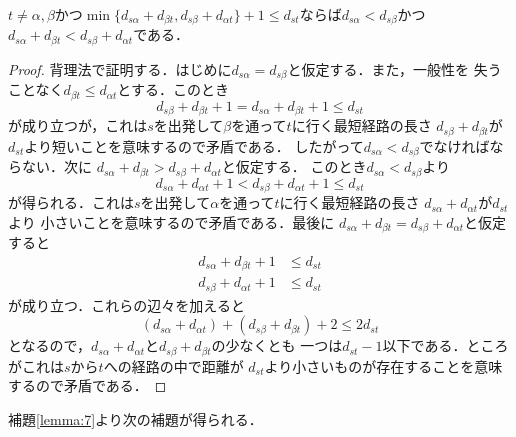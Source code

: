 \begin{lemma}
$t \neq \alpha, \beta$かつ$\min\{d_{s\alpha}+d_{\beta t}, d_{s\beta}+d_{\alpha t}\}+1
\leq d_{st}$ならば$d_{s\alpha}<d_{s\beta}$かつ$d_{s\alpha}+d_{\beta t} < d_{s\beta}+d_{\alpha t}$である．
\label{lemma:7}
\end{lemma}
\begin{proof}
背理法で証明する．はじめに$d_{s\alpha}=d_{s\beta}$と仮定する．また，一般性を
失うことなく$d_{\beta t} \leq d_{\alpha t}$とする．このとき
\[
 d_{s\beta}+d_{\beta t}+1=d_{s\alpha}+d_{\beta t}+1 \leq d_{st}
\]
が成り立つが，これは$s$を出発して$\beta$を通って$t$に行く最短経路の長さ
$d_{s\beta}+d_{\beta t}$が$d_{st}$より短いことを意味するので矛盾である．
したがって$d_{s\alpha}<d_{s\beta}$でなければならない．次に
$d_{s\alpha}+d_{\beta t} > d_{s\beta}+d_{\alpha t}$と仮定する．
このとき$d_{s\alpha}<d_{s\beta}$より
\[
 d_{s\alpha}+d_{\alpha t}+1 < d_{s\beta}+d_{\alpha t}+1 \leq d_{st}
\]
が得られる．これは$s$を出発して$\alpha$を通って$t$に行く最短経路の長さ
$d_{s\alpha}+d_{\alpha t}$が$d_{st}$より
小さいことを意味するので矛盾である．最後に
$d_{s\alpha}+d_{\beta t} = d_{s\beta}+d_{\alpha t}$と仮定すると
\begin{align}
d_{s\alpha}+d_{\beta t}+1 &\leq d_{st} \\
d_{s\beta }+d_{\alpha t}+1 &\leq d_{st}
\end{align}
が成り立つ．これらの辺々を加えると
\[
 (d_{s\alpha}+d_{\alpha t})+(d_{s\beta}+d_{\beta t})+2 \leq 2d_{st}
\]
となるので，$d_{s\alpha}+d_{\alpha t}$と$d_{s\beta}+d_{\beta t}$の少なくとも
一つは$d_{st}-1$以下である．ところがこれは$s$から$t$への経路の中で距離が
$d_{st}$より小さいものが存在することを意味するので矛盾である．
\end{proof}
%

補題\ref{lemma:7}より次の補題が得られる．

